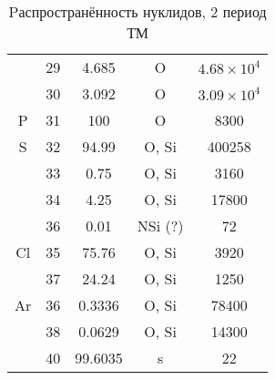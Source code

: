 \documentclass[a5paper,openany]{book}
\begin{document}
\begin{table}[h!]
{\begin{tabular}{ccccc}
			& 29 & 4.685 & O & $4.68 \times 10^{4}$ \\ [1mm] 			
			& 30 & 3.092 & O & $3.09 \times 10^{4}$ \\ [1mm] 
						P & 31 & 100 & O  &  8300 \\ [1mm]
			S & 32 & 94.99 & O, Si & 400258 \\ [1mm]
			& 33 & 0.75 & O, Si & 3160 \\ [1mm] 			
			& 34 & 4.25 & O, Si & 17800\\ [1mm] 
			& 36 & 0.01 & NSi (?) & 72 \\ [1mm]
			Cl & 35 & 75.76 & O, Si &  3920 \\ [1mm]
			& 37 & 24.24 & O, Si & 1250 \\ [1mm] 
			Ar & 36 & 0.3336 & O, Si &  78400 \\ [1mm]
			& 38 & 0.0629 & O, Si & 14300 \\ [1mm] 			
			& 40 & 99.6035 & s & 22\\ [1mm] 
			  \hline 
		\end{tabular}
	}
	\caption{Pаспространённость нуклидов, 2 период ТМ}
	\label{t:AbudanceII}
\end{table} 
\end{document}
